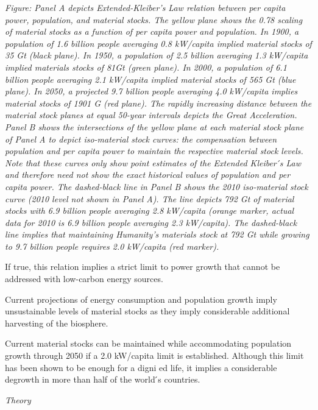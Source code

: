 \documentclass[
]{book}
\begin{document}
\emph{Figure: Panel A depicts Extended-Kleiber's Law relation between per capita power, population, and material
stocks. The yellow plane shows the 0.78 scaling of material stocks as a function of per capita power and
population. In 1900, a population of 1.6 billion people averaging 0.8 kW/capita implied material stocks of
35 Gt (black plane). In 1950, a population of 2.5 billion averaging 1.3 kW/capita implied materials stocks
of 81Gt (green plane). In 2000, a population of 6.1 billion people averaging 2.1 kW/capita implied
material stocks of 565 Gt (blue plane). In 2050, a projected 9.7 billion people averaging 4.0 kW/capita
implies material stocks of 1901 G (red plane). The rapidly increasing distance between the material stock
planes at equal 50-year intervals depicts the Great Acceleration. Panel B shows the intersections of the
yellow plane at each material stock plane of Panel A to depict iso-material stock curves: the
compensation between population and per capita power to maintain the respective material stock levels.
Note that these curves only show point estimates of the Extended Kleiber ́s Law and therefore need not
show the exact historical values of population and per capita power. The dashed-black line in Panel B
shows the 2010 iso-material stock curve (2010 level not shown in Panel A). The line depicts 792 Gt of
material stocks with 6.9 billion people averaging 2.8 kW/capita (orange marker, actual data for 2010 is
6.9 billion people averaging 2.3 kW/capita). The dashed-black line implies that maintaining Humanity's
materials stock at 792 Gt while growing to 9.7 billion people requires 2.0 kW/capita (red marker).}

If true, this relation implies a strict limit to power growth that cannot be addressed with low-carbon energy
sources.

Current projections of energy consumption and
population growth imply unsustainable levels of material stocks as they imply considerable additional
harvesting of the biosphere.

Current material stocks can be maintained while
accommodating population growth through 2050 if a 2.0 kW/capita limit is established. Although this
limit has been shown to be enough for a digni ed life, it implies a considerable degrowth in more than
half of the world ́s countries.

\emph{Theory}
\end{document}
